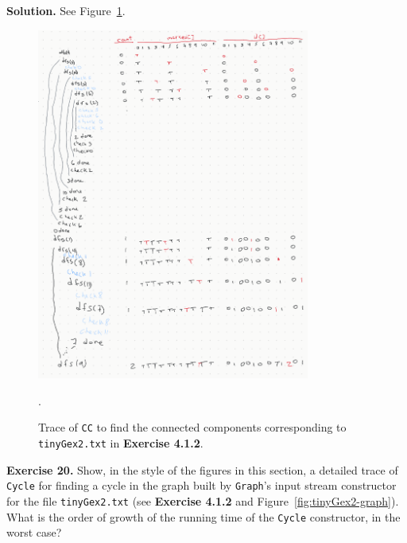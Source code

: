 \documentclass[12pt, a4paper]{article}
\newenvironment{ex}[2][Exercise]
{\par\medskip\noindent \textbf{#1 #2.}}
{\medskip}
\newenvironment{sol}[1][Solution]
{\par\medskip\noindent \textbf{#1.} }
{\medskip}
\begin{document}
	\begin{sol}
		See Figure~\ref{fig:ex-19}.
		\begin{figure}
			\centering
			\includegraphics[width=0.8\textwidth]{exercise-19.png}
			\caption{Trace of \texttt{CC} to find the connected components corresponding
			to \texttt{tinyGex2.txt} in \textbf{Exercise 4.1.2}.}
			\label{fig:ex-19}.
		\end{figure}
	\end{sol}
	\begin{ex}{20}
		Show, in the style of the figures in this section, a detailed trace of
		\texttt{Cycle} for finding a cycle in the graph built by \texttt{Graph}'s
		input stream constructor for the file \texttt{tinyGex2.txt} (see \textbf{Exercise 4.1.2}
		and Figure~\ref{fig:tinyGex2-graph}). What is the order of growth of the running time
		of the \texttt{Cycle} constructor, in the worst case?
	\end{ex}
\end{document}
